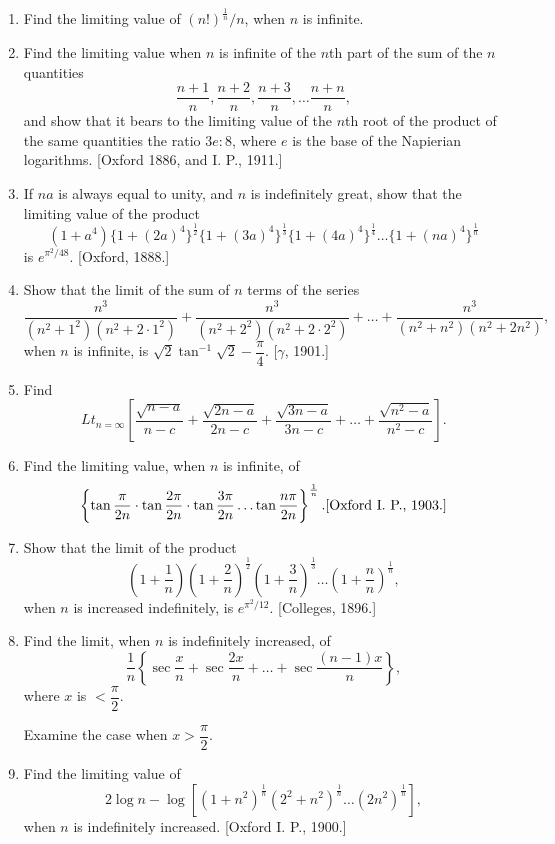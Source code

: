 \documentclass[11pt, a4paper]{article}
\newcommand{\source}[1]{\hfill\textnormal{[#1]}}
\begin{document}
\begin{enumerate}[leftmargin=2em]
\item Find the limiting value of $(n!)^{\frac1n}/n$, when $n$ is infinite.

\item Find the limiting value when $n$ is infinite of the $n$th part of the sum of the $n$ quantities
\[
\dfrac{n+1}{n}, \dfrac{n+2}{n}, \dfrac{n+3}{n}, \dots \dfrac{n+n}{n},
\]
and show that it bears to the limiting value of the $n$th root of the product of the same quantities the ratio $3e:8$, where $e$ is the base of the Napierian logarithms. \source{Oxford 1886, and I. P., 1911.}

\item If $na$ is always equal to unity, and $n$ is indefinitely great, show that the limiting value of the product
\[
(1+a^4)\{1+(2a)^4\}^{\frac12}\{1+(3a)^4\}^{\frac13}\{1+(4a)^4\}^{\frac14}\dots\{1+(na)^4\}^{\frac1n}
\]
is $e^{\pi^2/48}$. \source{Oxford, 1888.}

\item Show that the limit of the sum of $n$ terms of the series
\[
\dfrac{n^3}{(n^2+1^2)(n^2+2\cdot1^2)}+\dfrac{n^3}{(n^2+2^2)(n^2+2\cdot2^2)}+\dots+\dfrac{n^3}{(n^2+n^2)(n^2+2n^2)},
\]
when $n$ is infinite, is $\sqrt2\tan^{-1}\sqrt2-\dfrac{\pi}{4}$. \source{$\gamma$, 1901.}

\item Find
\[
Lt_{n=\infty}\left[\dfrac{\sqrt{n-a}}{n-c}+\dfrac{\sqrt{2n-a}}{2n-c}+\dfrac{\sqrt{3n-a}}{3n-c}+\dots+\dfrac{\sqrt{n^2-a}}{n^2-c}\right].
\]

\item Find the limiting value, when $n$ is infinite, of
\[
\left\{\tan\dfrac{\pi}{2n}\cdot\tan\dfrac{2\pi}{2n}\cdot\tan\dfrac{3\pi}{2n}\dots\tan\dfrac{n\pi}{2n}\right\}^{\frac1n}. \source{Oxford I. P., 1903.}
\]

\item Show that the limit of the product
\[
\left(1+\dfrac1n\right)\left(1+\dfrac2n\right)^{\frac12}\left(1+\dfrac3n\right)^{\frac13}\dots\left(1+\dfrac nn\right)^{\frac1n},
\]
when $n$ is increased indefinitely, is $e^{\pi^2/12}$. \source{Colleges, 1896.}

\item Find the limit, when $n$ is indefinitely increased, of
\[
\dfrac1n\left\{\sec\dfrac{x}{n}+\sec\dfrac{2x}{n}+\dots+\sec\dfrac{(n-1)x}{n}\right\},
\]
where $x$ is $<\dfrac{\pi}{2}$.

Examine the case when $x>\dfrac{\pi}{2}$.

\item Find the limiting value of
\[
2\log n-\log\left[(1+n^2)^{\frac1n}(2^2+n^2)^{\frac1n}\dots(2n^2)^{\frac1n}\right],
\]
when $n$ is indefinitely increased. \source{Oxford I. P., 1900.}


\end{enumerate}
\end{document}
